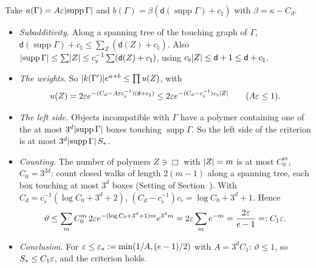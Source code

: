 \begin{detail}
\begin{step}
Take $a(\Gamma)=A\varepsilon\lvert\operatorname{supp}\Gamma\rvert$ and $b(\Gamma)=\beta(\mathsf d(\operatorname{supp}\Gamma)+c_\natural)$ with $\beta=\kappa-C_d$.
\begin{itemize}
\item \emph{Subadditivity.} Along a spanning tree of the touching graph of $\Gamma$, $\mathsf d(\operatorname{supp}\Gamma)+c_\natural\le\sum_Z(\mathsf d(Z)+c_\natural)$. Also $\lvert\operatorname{supp}\Gamma\rvert\le\sum\lvert Z\rvert\le c_\flat^{-1}\sum(\mathsf d(Z)+c_\natural)$, using $c_\flat\lvert Z\rvert\le\mathsf d+1\le\mathsf d+c_\natural$.
\item \emph{The weights.} So $\lvert k(\Gamma')\rvert e^{a+b}\le\prod u(Z)$, with
\[
u(Z)=2\varepsilon e^{-(C_d-A\varepsilon c_\flat^{-1})(\mathsf d+c_\natural)}\le2\varepsilon e^{-(C_d-c_\flat^{-1})c_\flat\lvert Z\rvert}\qquad(A\varepsilon\le1).
\]
\item \emph{The left side.} Objects incompatible with $\Gamma$ have a polymer containing one of the at most $3^d\lvert\operatorname{supp}\Gamma\rvert$ boxes touching $\operatorname{supp}\Gamma$. So the left side of the criterion is at most $3^d\lvert\operatorname{supp}\Gamma\rvert\,S_*$.
\item \emph{Counting.} The number of polymers $Z\ni\Box$ with $\lvert Z\rvert=m$ is at most $C_0^m$, $C_0=3^{2d}$: count closed walks of length $2(m-1)$ along a spanning tree, each box touching at most $3^d$ boxes (Setting of Section~). With $C_d=c_\flat^{-1}(\log C_0+3^d+2)$, $(C_d-c_\flat^{-1})c_\flat=\log C_0+3^d+1$. Hence
\[
\vartheta\le\sum_m C_0^m\,2\varepsilon e^{-(\log C_0+3^d+1)m}e^{3^dm}=2\varepsilon\sum_me^{-m}=\frac{2\varepsilon}{e-1}=:C_1\varepsilon .
\]
\item \emph{Conclusion.} For $\varepsilon\le\varepsilon_*:=\min(1/A,(e-1)/2)$ with $A=3^dC_1$: $\vartheta\le1$, so $S_*\le C_1\varepsilon$, and the criterion holds.
\end{itemize}
\end{step}


\end{detail}
